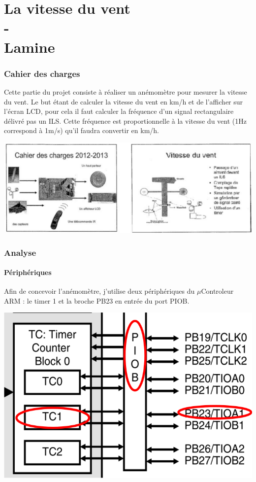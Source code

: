\documentclass[a4paper]{report}
\begin{document}
\part{La vitesse du vent\\-\\Lamine {}}
\section{Cahier des charges}
Cette partie du projet consiste à réaliser un anémomètre pour mesurer la vitesse du vent.
Le but étant de calculer la vitesse du vent en km/h et de l'afficher sur l'écran LCD, pour cela il faut calculer la fréquence d'un signal rectangulaire délivré pas un ILS.
Cette fréquence est proportionnelle à la vitesse du vent (1Hz correspond à 1m/s) qu'il faudra convertir en km/h.

\begin{center}
	\includegraphics[scale=0.3]{images/VENT_fig1.png}
\end{center}

\section{Analyse}
\subsection{Périphériques}
Afin de concevoir l’anémomètre, j'utilise deux périphériques du $\mu$Controleur ARM : le timer 1 et la broche PB23 en entrée du port PIOB.

\begin{center}
	\includegraphics[scale=0.3]{images/VENT_fig2.png}
\end{center}
\end{document}
